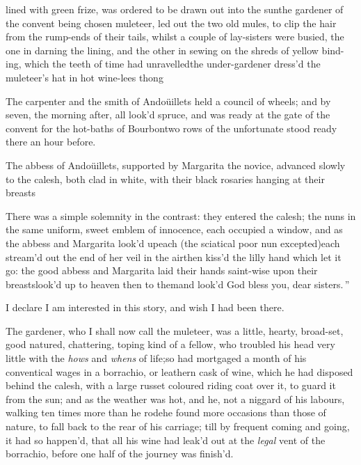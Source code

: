 \documentclass{article}
\begin{document}
\noindent
{}\break lined with green frize,
was ordered to be drawn out into the sun\tsk the gardener of the
convent being chosen muleteer, led out the two old mules, to clip
the hair from the rump-ends of their tails, whilst a couple of
lay-sisters were busied, the one in darning the lining, and the
other in sewing on the shreds of yellow bind-
ing, which the teeth of time had un\-ravelled\tsh the under-gardener dress’d
the muleteer’s hat in hot wine-lees\tsh\break 
{}
thong\tsh

\tsh The carpenter and the smith of Andoüillets held a council
of wheels; and by seven, the morning after, all look’d spruce,
and was ready at the gate of the convent for the hot-baths of
Bourbon\tsk\break two rows of the unfortunate stood ready there an
hour before.

The abbess of Andoüillets, supported by Margarita the novice, advanced slowly to the
calesh, both clad in white, with their black rosaries hanging at their breasts\tsh

\tsh There was a simple solemnity\break
in the contrast: they entered the calesh;\break
the nuns in the same uniform, sweet\break
emblem of innocence, each occupied a\break
window, and as the abbess and Margarita\break
look’d up\tsk each (the sciatical poor nun\break
excepted)\tsk each stream’d out the end of\break
her veil in the air\tsk then kiss’d the lilly\break
hand which let it go: the good abbess\break
and Margarita laid their hands saint-wise\break
upon their breasts\tsk look’d up to heaven\break
\tsk then to them\tsk and look’d \lqq God bless\break
\lqq you, dear sisters.\,”

I declare I am interested in this story, and wish I had been
there.

The gardener, who I shall now call the muleteer, was a little,
hearty, broad-set, good natured, chattering, toping kind of a
fellow, who troubled his head very little with the \textit{hows} and
\textit{whens} of life;\break so had mortgaged a month of his conventical
wages in a borrachio, or leathern cask of wine, which he had
disposed behind the calesh, with a large russet coloured
riding coat over it, to guard it from the sun; and as the weather
was hot, and he, not a niggard of his labours, walking ten times
more than he rode\tsk he found more occasions than those of
nature, to fall back to the rear of his carriage; till by frequent
coming and going, it had so happen’d, that all his wine had
leak’d out at the \textit{legal} vent of\break
the borrachio, before one half of the\break
journey was finish’d.
\end{document}
